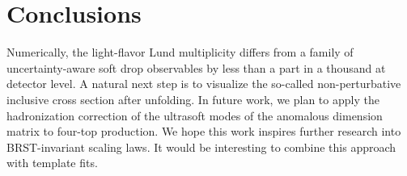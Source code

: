 \section{Conclusions}\label{sec:conclusions}

Numerically, the light-flavor Lund multiplicity differs from a family of
uncertainty-aware soft drop observables by less than a part in a
thousand at detector level. A natural next step is to visualize the
so-called non-perturbative inclusive cross section after unfolding. In
future work, we plan to apply the hadronization correction of the
ultrasoft modes of the anomalous dimension matrix to four-top
production. We hope this work inspires further research into
BRST-invariant scaling laws. It would be interesting to combine this
approach with template fits.

